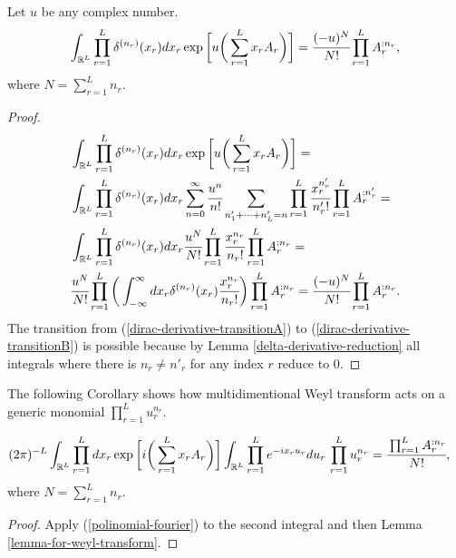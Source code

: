 \documentclass[main.tex]{subfiles}
\begin{document}
\begin{lemma}
\label{lemma-for-weyl-transform}
Let $u$ be any complex number.
\begin{equation}
\int_{\mathbb{R}^L} \prod_{r=1}^L \delta^{(n_r)}(x_r) dx_r \exp\bigg[ u\bigg( \sum_{r=1}^L x_r A_r \bigg)\bigg] = \cfrac{(-u)^N}{N!} \prod_{r=1}^L A_r^{:n_r},
\end{equation}
where $N = \sum_{r=1}^L n_r$.
\end{lemma}
\begin{proof}
\begin{align}
& \int_{\mathbb{R}^L} \prod_{r=1}^L \delta^{(n_r)}(x_r) dx_r \exp\bigg[ u\bigg( \sum_{r=1}^L x_r A_r \bigg)\bigg] = \\
\label{dirac-derivative-transitionA}
& \int_{\mathbb{R}^L} \prod_{r=1}^L \delta^{(n_r)}(x_r) dx_r \sum_{n=0}^\infty \cfrac{u^n}{n!}
\sum_{n'_1 + \cdots + n'_L = n} \prod_{r=1}^L \cfrac{x_{r}^{n'_{r}}}{n'_{r}!} \prod_{r=1}^L A_{r}^{:n'_{r}} = \\
\label{dirac-derivative-transitionB}
& \int_{\mathbb{R}^L} \prod_{r=1}^L \delta^{(n_r)}(x_r) dx_r \cfrac{u^N}{N!}
\prod_{r=1}^L \cfrac{x_{r}^{n_{r}}}{n_{r}!} \prod_{r=1}^L A_{r}^{:n_{r}} = \\
& \cfrac{u^N}{N!} \prod_{r=1}^L \bigg( \int_{-\infty}^\infty dx_r 
\delta^{(n_r)}(x_r) \cfrac{x_r^{n_r}}{n_r!}\bigg)
\prod_{r=1}^L A_{r}^{:n_{r}} = \cfrac{(-u)^N}{N!} \prod_{r=1}^L A_r^{:n_r}.
\end{align}
The transition from (\ref{dirac-derivative-transitionA}) to (\ref{dirac-derivative-transitionB}) is possible because by Lemma \ref{delta-derivative-reduction} all integrals where there is $n_r \not= n'_{r}$ for any index $r$ reduce to $0$.
\end{proof} 

The following Corollary shows how multidimentional Weyl transform acts on a generic monomial $\prod_{r=1}^L u_r^{n_r}$.

\begin{corollary}
\label{corollary-for-weyl-transform}
\begin{align*}
&(2\pi)^{-L}\int_{\mathbb{R}^L} \prod_{r=1}^L dx_r \exp\bigg[ i\bigg( \sum_{r=1}^L x_r A_r \bigg)\bigg]
\int_{\mathbb{R}^L}
\prod_{r=1}^L e^{-ix_ru_r}du_r\, \prod_{r=1}^L u_r^{n_r} = \cfrac{\prod_{r=1}^L A_{r}^{:n_{r}}}{N!},
\end{align*}
where $N = \sum_{r=1}^L n_r$.
\end{corollary}
\begin{proof}
Apply (\ref{polinomial-fourier}) to the second integral and then Lemma \ref{lemma-for-weyl-transform}.
\end{proof}
\end{document}
